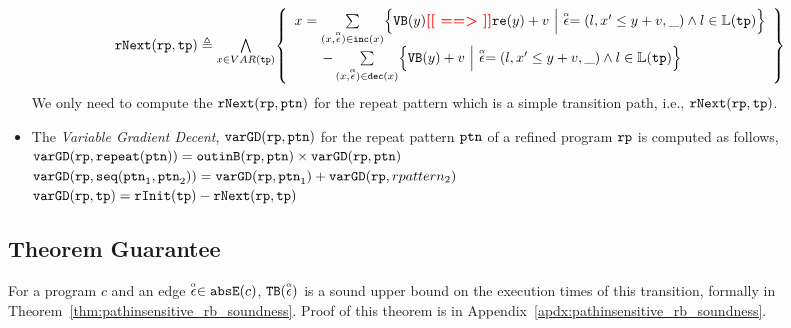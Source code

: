 \begin{defn}
\begin{itemize}
   \[
     \begin{array}{l}
     \rfnext(\rprog, \tpath) \triangleq 
     \bigwedge\limits_{x \in VAR(\tpath)}
     \left\{ 
       \begin{array}{l}
     x =   \sum\limits_{(x, \absevent) \in \inc(x) }
     \left\{ 
       {\varinvar(y) \todo{==>} \reset(y)}+ v ~\middle\vert~ \absevent = (l, x' \leq y + v, \_) \land l \in \lvar(\tpath)\right\}
       \\ \qquad 
       - \sum\limits_{(x, \absevent) \in \dec(x) }\left\{ 
         \varinvar(y) + v ~\middle\vert~ \absevent = (l, x' \leq y + v, \_) \land l \in \lvar(\tpath) \right\}
       \end{array}
     \right\}
     \end{array}
   \]
   We only need to compute the $\mathtt{rNext}(\mathtt{rp}, \mathtt{ptn})$ for the repeat pattern which is a simple transition path,
   i.e., $\mathtt{rNext}(\mathtt{rp}, \mathtt{tp})$.
   \item  The \emph{Variable Gradient Decent}, $\mathtt{varGD}(\mathtt{rp}, \mathtt{ptn})$ for the repeat pattern $\mathtt{ptn}$ of a refined program $\mathtt{rp}$ is computed as follows,
   \\
   {$\mathtt{varGD}(\mathtt{rp}, \mathtt{repeat}(\mathtt{ptn})) =  \mathtt{outinB}(\mathtt{rp}, \mathtt{ptn}) \times {\ensuremath{\mathtt{varGD}}(\ensuremath{\mathtt{rp}}, \ensuremath{\mathtt{ptn}})}$}
   \\
   $\mathtt{varGD}(\mathtt{rp}, \mathtt{seq}(\mathtt{ptn}_1, \mathtt{ptn}_2)) =  \mathtt{varGD}(\mathtt{rp}, \mathtt{ptn}_1)+ \mathtt{varGD}(\mathtt{rp}, rpattern_2)$
   \\
   $\mathtt{varGD}(\mathtt{rp}, \mathtt{tp}) =  \mathtt{rInit}(\mathtt{tp}) - \mathtt{rNext}(\mathtt{rp}, \mathtt{tp})$   
    \end{itemize}
\end{defn}
    

\subsection{Theorem Guarantee}
  \label{sec:outinalg-theorem}
  For a program $c$ and an edge $\stackrel{\scriptscriptstyle{\alpha}}{\mathtt{\epsilon}{}} \in \mathtt{abs}{\mathtt{E}}(c)$,
  ${\mathtt{TB}}(\stackrel{\scriptscriptstyle{\alpha}}{\mathtt{\epsilon}{}})$ is a sound upper bound
  on the execution times of this transition,
  formally in Theorem~\ref{thm:pathinsensitive_rb_soundness}. 
  Proof of this theorem is in Appendix~\ref{apdx:pathinsensitive_rb_soundness}.

